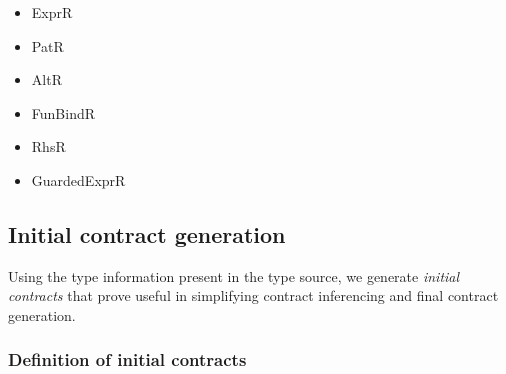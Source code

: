 \documentclass[10pt]{report}
\newcommand{\code}[1]{%
  {%
   \setlength{\fboxsep}{-2\fboxrule}%
   \fcolorbox{black}{light-gray}{\hspace{1.5pt}\strut\texttt{#1}\hspace{1.5pt}}%
  }%
}
\begin{document}
%
%

\begin{itemize}
	\item ExprR
	\item PatR
	\item AltR
	\item FunBindR
	\item RhsR
	\item GuardedExprR
\end{itemize}

\subsection{Initial contract generation}
\label{subsection:contractgeneration}

Using the type information present in the type source, we generate \textit{initial contracts} that prove useful in simplifying contract inferencing and final contract generation.

\subsubsection{Definition of initial contracts}
\end{document}
